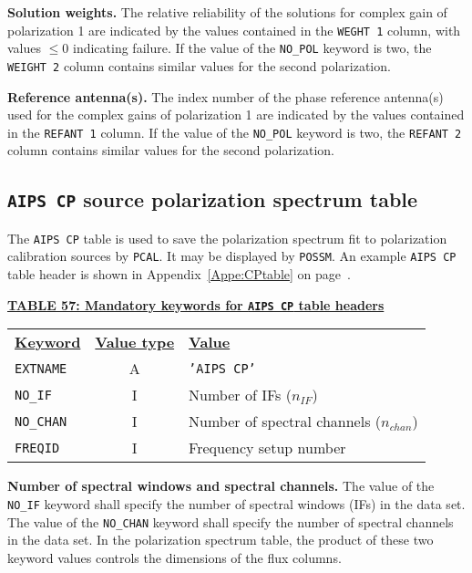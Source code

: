 \documentclass[twoside]{article}
\newcommand{\nif}{$n_{IF}$}
\newcommand{\nchan}{$n_{chan}$}
\begin{document}
{\bf Solution weights.} The relative reliability of the solutions for
complex gain of polarization 1 are indicated by the values contained
in the {\tt WEGHT 1} column, with values $\leq 0$ indicating failure.
If the value of the {\tt NO\_POL} keyword is two, the {\tt WEIGHT 2}
column contains similar values for the second polarization.

{\bf Reference antenna(s).} The index number of the phase reference
antenna(s) used for the complex gains of polarization 1 are indicated
by the values contained in the {\tt REFANT 1} column.  If the value of
the {\tt NO\_POL} keyword is two, the {\tt REFANT 2} column contains
similar values for the second polarization.
\vfill\eject

\subsection{{\tt AIPS CP} source polarization spectrum table}
\label{s:CP}

The {\tt AIPS CP} table is used to save the polarization spectrum fit
to polarization calibration sources by {\tt PCAL}\@.  It may be
displayed by {\tt POSSM}\@.  An example {\tt AIPS CP} table header is
shown in Appendix~\ref{Appe:CPtable} on page~\pageref{Appe:CPtable}.

\begin{center}
\underline{\bf{TABLE 57: Mandatory keywords for {\tt AIPS CP} table
    headers}}\\
\begin{tabular}{lcl}
\noalign{\vspace{2pt}} \label{ta:CPkeys}
\underline{{\bf Keyword}} & \underline{\bf{Value type}} &
    \underline{\bf{Value\vphantom{y}}} \\
\noalign{\vspace{2pt}}
{\tt EXTNAME}  & A & {\tt 'AIPS CP'}  \\
{\tt NO\_IF}   & I & Number of IFs (\nif)\\
{\tt NO\_CHAN} & I & Number of spectral channels (\nchan) \\
{\tt FREQID}   & I & Frequency setup number
\end{tabular}
\end{center}

{\bf Number of spectral windows and spectral channels.} The value of
the {\tt NO\_IF} keyword shall specify the number of spectral windows
(IFs) in the data set.  The value of the {\tt NO\_CHAN} keyword shall
specify the number of spectral channels in the data set.  In the
polarization spectrum table, the product of these two keyword values
controls the dimensions of the flux columns.
\end{document}
